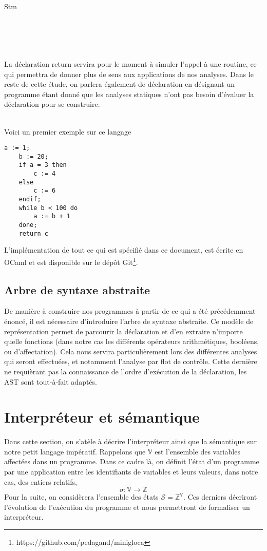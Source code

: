 \documentclass[a4paper, 10pt]{article}
\begin{document}
\begin{dtype}{Stm}
  \\
  \\
  \akind{\sskip}\\
  \\
  \\
\end{dtype}
La déclaration return servira pour le moment à simuler l'appel à une routine, ce qui permettra de donner plus de sens aux applications de nos analyses.
Dans le reste de cette étude, on parlera également de déclaration en désignant un programme étant donné que les analyses statiques
n'ont pas besoin d'évaluer la déclaration pour se construire.
\\
\\
\begin{example}
	Voici un premier exemple sur ce langage
	\begin{lstlisting}[tabsize=2]
	a := 1;
	b := 20;
	if a = 3 then
		c := 4
	else
		c := 6
	endif;
	while b < 100 do
		a := b + 1
	done;
	return c
	\end{lstlisting}
\end{example}
L'implémentation de tout ce qui est spécifié dans ce document, est écrite en OCaml et est disponible sur le dépôt Git\footnote{https://github.com/pedagand/minigloca}.

\subsection{Arbre de syntaxe abstraite}
De manière à construire nos programmes à partir de ce qui a été précédemment énoncé, il est nécessaire d'introduire 
l'arbre de syntaxe abstraite. Ce modèle de représentation permet de parcourir la déclaration et d'en extraire n'importe
quelle fonctions (dans notre cas les différents opérateurs arithmétiques, booléens, ou d'affectation). 
Cela nous servira particulièrement lors des différentes analyses qui seront effectuées, et notamment l'analyse par flot de contrôle. 
Cette dernière ne requièrant pas la connaissance de l'ordre d'exécution de la déclaration, les AST sont tout-à-fait adaptés.

\section{Interpréteur et sémantique}
Dans cette section, on s'atèle à décrire l'interpréteur ainsi que la sémantique sur notre petit langage impératif. Rappelons que
$\mathbb{V}$ est l'ensemble des variables affectées dans un programme.
Dans ce cadre là, on définit l'état d'un programme par une application entre les identifiants de variables et leurs valeurs, 
dans notre cas, des entiers relatifs,
\[\sigma : \mathbb{V} \longrightarrow \mathbb{Z}\]
Pour la suite, on considèrera l'ensemble des états $\mathcal{S} = \mathbb{Z}^\mathbb{V}$.
Ces derniers décriront l'évolution de l'exécution du programme et nous permettront de formaliser un interpréteur.
\end{document}
